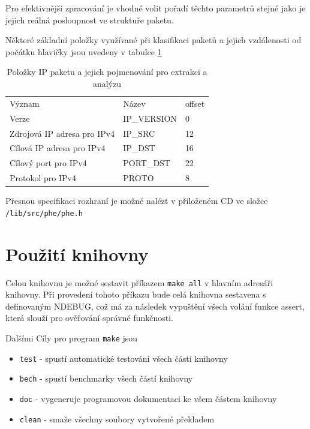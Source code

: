 Pro efektivnější zpracování je vhodné volit pořadí těchto parametrů stejné jako je jejich reálná
posloupnost ve struktuře paketu.

Některé základní položky využívané při klasifikaci paketů a jejich vzdálenosti od počátku hlavičky
jsou uvedeny v tabulce \ref{tab:phe}

\begin{table}[!htbp]
	\center
    \begin{tabular}{|l|l|l|}
    \hline
    Význam & Název & offset \\ \hhline{|=|=|=|}
    Verze & IP\_VERSION & 0 \\ \hline
    Zdrojová IP adresa pro IPv4 & IP\_SRC & 12 \\ \hline
    Cílová IP adresa pro IPv4 & IP\_DST & 16 \\ \hline
    Cílový port pro IPv4 & PORT\_DST & 22 \\ \hline
    Protokol pro IPv4 & PROTO & 8 \\ \hline
    \end{tabular}
	\caption{Položky IP paketu a jejich pojmenování pro extrakci a analýzu}
    \label{tab:phe}
\end{table}

Přesnou specifikaci rozhraní je možné nalézt v přiloženém CD ve složce \texttt{/lib/src/phe/phe.h}


\section{Použití knihovny}\label{api:usage} %
Celou knihovnu je možné sestavit příkazem \texttt{make all} v hlavním adresáři knihovny.
Při provedení tohoto příkazu bude celá knihovna sestavena s definovaným NDEBUG, což má za následek vypuštění všech
volání funkce assert, která slouží pro ověřování správné funkčnosti.

Dalšími Cíly pro program \texttt{make} jsou

\begin{itemize}
	\item{\texttt{test} - spustí automatické testování všech částí knihovny}
	\item{\texttt{bech} - spustí benchmarky všech částí knihovny}
	\item{\texttt{doc} - vygeneruje programovou dokumentaci ke všem částem knihovny}
	\item{\texttt{clean} - smaže všechny soubory vytvořené překladem}
\end{itemize}

